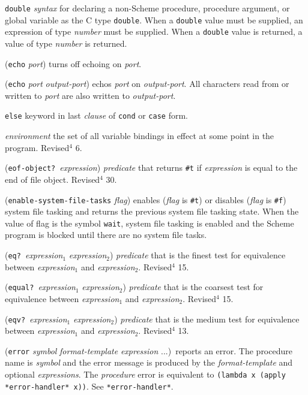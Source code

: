 \documentclass[10pt,twocolumn]{article}
\begin{document}
\texttt{double} \emph{syntax} for declaring a non-Scheme procedure, procedure
argument, or global variable as the C type \texttt{double}. When a
\texttt{double} value must be supplied, an expression of type \emph{number}
must be supplied.  When a \texttt{double} value is returned, a value of
type \emph{number} is returned.

(\texttt{echo} \emph{port}) turns off echoing on \emph{port}.

(\texttt{echo} \emph{port} \emph{output-port}) echos \emph{port} on
\emph{output-port}.  All characters read from or written to \emph{port}
are also written to \emph{output-port}.

\texttt{else} keyword in last \emph{clause} of \texttt{cond} or \texttt{case} form.

\emph{environment} the set of all variable bindings in effect at
some point in the program.  Revised$^4$ 6.

(\texttt{eof-object?}\ \emph{expression}) \emph{predicate} that returns
\texttt{\#t} if \emph{expression} is equal to the end of file object.
Revised$^4$ 30.

(\texttt{enable-system-file-tasks} \emph{flag}) enables (\emph{flag} is
\texttt{\#t}) or disables (\emph{flag} is \texttt{\#f}) system file tasking
and returns the previous system file tasking state.  When the
value of flag is the symbol \texttt{wait}, system file tasking is
enabled and the Scheme program is blocked until there are no
system file tasks.

(\texttt{eq?}\ \emph{expression}$_1$ \emph{expression}$_2$) \emph{predicate} that is
the finest test for equivalence between \emph{expression}$_1$ and
\emph{expression}$_2$.  Revised$^4$ 15.

(\texttt{equal?}\ \emph{expression}$_1$ \emph{expression}$_2$) \emph{predicate} that
is the coarsest test for equivalence between \emph{expression}$_1$ and
\emph{expression}$_2$.  Revised$^4$ 15.

(\texttt{eqv?}\ \emph{expression}$_1$ \emph{expression}$_2$) \emph{predicate} that is
the medium test for equivalence between \emph{expression}$_1$ and
\emph{expression}$_2$.  Revised$^4$ 13.

(\texttt{error} \emph{symbol} \emph{format-template} \emph{expression} ...)\ reports
an error.  The procedure name is \emph{symbol} and the error message is
produced by the \emph{format-template} and optional \emph{expressions}.
The \emph{procedure} error is equivalent to \texttt{(lambda x (apply
*error-handler* x))}.  See \texttt{*error-handler*}.
\end{document}
